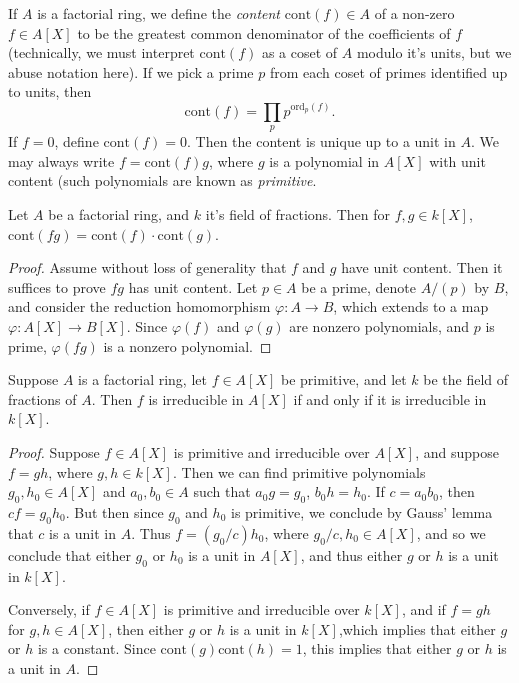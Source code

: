 %
If $A$ is a factorial ring, we define the \emph{content} $\text{cont}(f) \in A$ of a non-zero $f \in A[X]$ to be the greatest common denominator of the coefficients of $f$ (technically, we must interpret $\text{cont}(f)$ as a coset of $A$ modulo it's units, but we abuse notation here). If we pick a prime $p$ from each coset of primes identified up to units, then 
%
\[ \text{cont}(f) = \prod_p p^{\text{ord}_p(f)}. \]
%
If $f = 0$, define $\text{cont}(f) = 0$. Then the content is unique up to a unit in $A$. We may always write $f = \text{cont}(f)g$, where $g$ is a polynomial in $A[X]$ with unit content (such polynomials are known as \emph{primitive}.

\begin{lemma}[Gauss]
    Let $A$ be a factorial ring, and $k$ it's field of fractions. Then for $f,g \in k[X]$, $\text{cont}(fg) = \text{cont}(f) \cdot \text{cont}(g)$.
\end{lemma}
\begin{proof}
    Assume without loss of generality that $f$ and $g$ have unit content. Then it suffices to prove $fg$ has unit content. Let $p \in A$ be a prime, denote $A/(p)$ by $B$, and consider the reduction homomorphism $\varphi: A \to B$, which extends to a map $\varphi: A[X] \to B[X]$. Since $\varphi(f)$ and $\varphi(g)$ are nonzero polynomials, and $p$ is prime, $\varphi(fg)$ is a nonzero polynomial.
\end{proof}

\begin{corollary}
    Suppose $A$ is a factorial ring, let $f \in A[X]$ be primitive, and let $k$ be the field of fractions of $A$. Then $f$ is irreducible in $A[X]$ if and only if it is irreducible in $k[X]$.
\end{corollary}
\begin{proof}
    Suppose $f \in A[X]$ is primitive and irreducible over $A[X]$, and suppose $f = gh$, where $g,h \in k[X]$. Then we can find primitive polynomials $g_0,h_0 \in A[X]$ and $a_0,b_0 \in A$ such that $a_0g = g_0$, $b_0h = h_0$. If $c = a_0b_0$, then $cf = g_0h_0$. But then since $g_0$ and $h_0$ is primitive, we conclude by Gauss' lemma that $c$ is a unit in $A$. Thus $f = (g_0/c) h_0$, where $g_0/c, h_0 \in A[X]$, and so we conclude that either $g_0$ or $h_0$ is a unit in $A[X]$, and thus either $g$ or $h$ is a unit in $k[X]$.

    Conversely, if $f \in A[X]$ is primitive and irreducible over $k[X]$, and if $f = gh$ for $g,h \in A[X]$, then either $g$ or $h$ is a unit in $k[X]$,which implies that either $g$ or $h$ is a constant. Since $\text{cont}(g) \text{cont}(h) = 1$, this implies that either $g$ or $h$ is a unit in $A$.
\end{proof}

